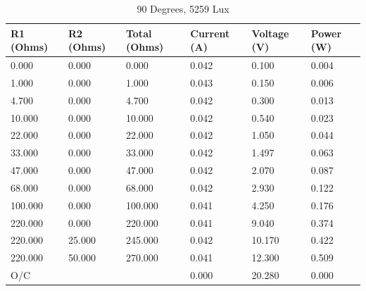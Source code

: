 \documentclass{article}
\begin{document}
		\begin{table}[H]
			\centering
			\caption{90 Degrees, 5259 Lux}
			\begin{tabular}{|l|l|l|l|l|l|}
				\hline
				
				\textbf{R1 (Ohms)} & \textbf{R2 (Ohms)} & \textbf{Total (Ohms)} & \textbf{Current (A)} & \textbf{Voltage (V)} & \textbf{Power (W)} \\ \hline
				0.000 & 0.000 & 0.000 & 0.042 & 0.100 & 0.004 \\ \hline
				1.000 & 0.000 & 1.000 & 0.043 & 0.150 & 0.006 \\ \hline
				4.700 & 0.000 & 4.700 & 0.042 & 0.300 & 0.013 \\ \hline
				10.000 & 0.000 & 10.000 & 0.042 & 0.540 & 0.023 \\ \hline
				22.000 & 0.000 & 22.000 & 0.042 & 1.050 & 0.044 \\ \hline
				33.000 & 0.000 & 33.000 & 0.042 & 1.497 & 0.063 \\ \hline
				47.000 & 0.000 & 47.000 & 0.042 & 2.070 & 0.087 \\ \hline
				68.000 & 0.000 & 68.000 & 0.042 & 2.930 & 0.122 \\ \hline
				100.000 & 0.000 & 100.000 & 0.041 & 4.250 & 0.176 \\ \hline
				220.000 & 0.000 & 220.000 & 0.041 & 9.040 & 0.374 \\ \hline
				220.000 & 25.000 & 245.000 & 0.042 & 10.170 & 0.422 \\ \hline
				220.000 & 50.000 & 270.000 & 0.041 & 12.300 & 0.509 \\ \hline
				O/C & & & 0.000 & 20.280 & 0.000 \\ \hline
				
			\end{tabular}
		\end{table}
		
\end{document}
